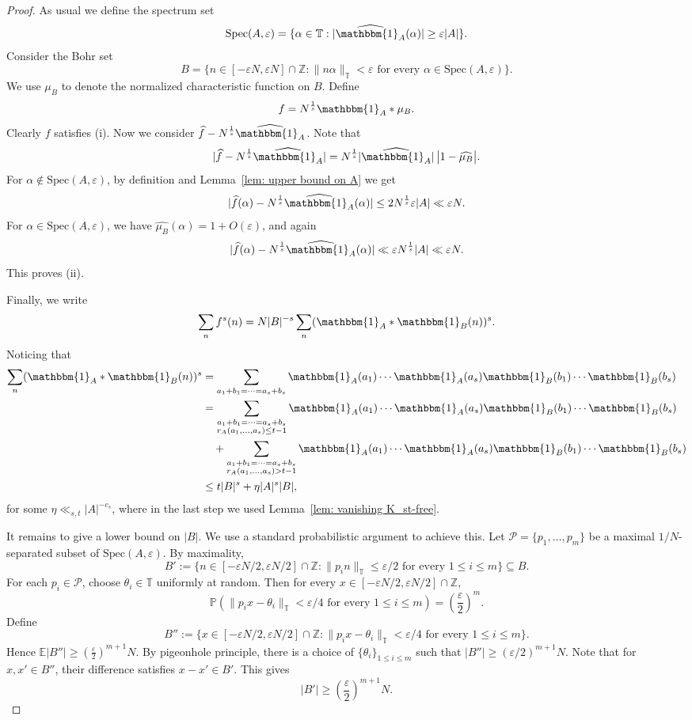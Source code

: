 \documentclass[A4paper,reqno,oneside,12pt]{amsart}
\theoremstyle{plain}
\theoremstyle{definition}
\newcommand{\e}{\mathbbm{1}}          %
\newcommand{\Z}{\mathbb{Z}}
\newcommand{\TT}{\mathbb{T}}
\newcommand{\abs}[1]{\left| #1 \right|}
\begin{document}
\begin{proof}
As usual we define the spectrum set
\[
\mathrm{Spec}(A,\varepsilon) = \{\alpha\in \TT: |\widehat{\e_A}(\alpha)|\geq \varepsilon |A|\}. 
\]
Consider the Bohr set
\[
B=\{n\in [-\varepsilon N,\varepsilon N]\cap\Z: \|n\alpha\|_\TT<\varepsilon \text{ for every } \alpha\in \mathrm{Spec}(A,\varepsilon)\}. 
\]
We use $\mu_B$ to denote the normalized characteristic function on $B$. Define
\[
f=N^{\frac1s}\e_A*\mu_B.
\]
Clearly $f$ satisfies (i). Now we consider $\widehat{f}-N^{\frac{1}{s}}\widehat{\e_A}$. Note that
\[
   | \widehat{f}-N^{\frac{1}{s}}\widehat{\e_A} |= N^{\frac1s}|\widehat{\e_A}|\, \bigl|1-\widehat{\mu_B}\bigr|. 
\]
For $\alpha\notin \mathrm{Spec}(A,\varepsilon)$, by definition and  Lemma~\ref{lem: upper bound on A} we get
\[
| \widehat{f}(\alpha)-N^{\frac{1}{s}}\widehat{\e_A} (\alpha)|\leq 2N^{\frac1s}\varepsilon|A|\ll \varepsilon N.
\]
 For $\alpha\in \mathrm{Spec}(A,\varepsilon)$, we have $\widehat{\mu_B}(\alpha)=1+O(\varepsilon)$, and again
\[
| \widehat{f}(\alpha)-N^{\frac{1}{s}}\widehat{\e_A} (\alpha)|\ll \varepsilon N^{\frac1s}|A|\ll \varepsilon N.
\]
This proves (ii).

Finally, we write 
\[
\sum_n f^s(n) = N |B|^{-s} \sum_n (\e_A*\e_B(n))^s.
\]
Noticing that 
\begin{align*}
    \sum_n (\e_A*\e_B(n))^s
    &=\sum_{a_1+b_1=\cdots =a_s+b_s} \e_A(a_1)\cdots\e_A(a_s)\e_B(b_1)\cdots\e_B(b_s)\\
    &=\sum_{\substack{a_1+b_1=\cdots =a_s+b_s\\ r_A(a_1,\dots,a_s)\leq t-1}} \e_A(a_1)\cdots\e_A(a_s)\e_B(b_1)\cdots\e_B(b_s) \\
    &\quad + \sum_{\substack{a_1+b_1=\cdots =a_s+b_s\\ r_A(a_1,\dots,a_s)> t-1}} \e_A(a_1)\cdots\e_A(a_s)\e_B(b_1)\cdots\e_B(b_s)\\
    &\leq t|B|^s+ \eta |A|^{s}|B|,
\end{align*}
for some $\eta\ll_{s,t}|A|^{-c_s}$, 
where in the last step we used Lemma~\ref{lem: vanishing K_st-free}.


It remains to give a lower bound on $|B|$. We use a standard probabilistic argument to achieve this. 
Let $\mathcal{P}=\{p_1,\dots, p_m\}$ be a maximal $1/N$-separated subset of $\mathrm{Spec}(A,\varepsilon)$. By maximality,
\[
B':=\{ n\in [-\varepsilon N/2,\varepsilon N/2]\cap\Z: \| p_in\|_\TT\leq \varepsilon/2 \text{ for every } 1\leq i\leq m\}\subseteq B.
\]
For each $p_i\in\mathcal{P}$, choose $\theta_i\in\TT$ uniformly at random. Then for every $x\in [-\varepsilon N/2,\varepsilon N/2]\cap\Z$,
\[
\mathbb{P}(\|p_ix-\theta_i\|_\TT<\varepsilon/4\text{ for every } 1\leq i\leq m)=\left(\frac{\varepsilon}{2}\right)^m.
\]
Define
\[
B'':=\{x\in [-\varepsilon N/2,\varepsilon N/2]\cap\Z:\|p_ix-\theta_i\|_\TT<\varepsilon/4\text{ for every } 1\leq i\leq m\}. 
\]
Hence $\mathbb{E}\abs{B''}\geq \left(\frac{\varepsilon}{2}\right)^{m+1} N.$
By pigeonhole principle, there is a choice of $\{\theta_i\}_{1\le i \le m}$ such that $\abs{B''}\geq (\varepsilon/2)^{m+1}N$. Note that for $x,x'\in B''$, their difference satisfies $x-x'\in B'$. This gives
\[
 \abs{B'}\geq \left(\frac{\varepsilon}{2}\right)^{m+1} N.
\]


\end{proof}
\end{document}
